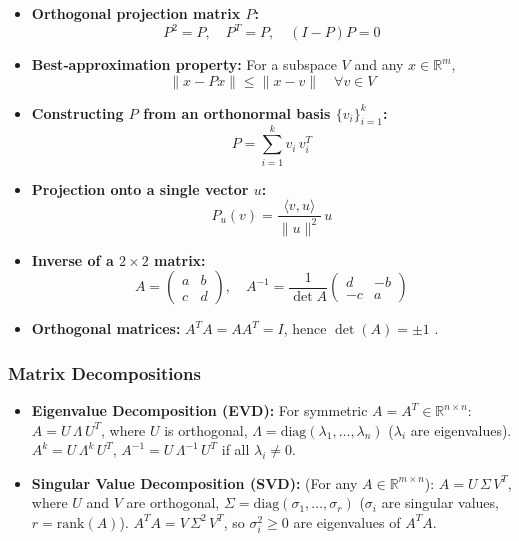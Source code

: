 \begin{itemize}
            \begin{graytext}(3)\end{graytext} $\ker(A)=\{0\}$,\hspace{1.5em} \begin{graytext}(4)\end{graytext} $\mathrm{im}(A)=\mathbb R^n$
      \item \textbf{Orthogonal projection matrix \(P\):}
            \[
                  P^2=P,\quad P^T=P,\quad (I-P)P=0
            \]
      \item \textbf{Best‐approximation property:}
            For a subspace \(V\) and any \(x\in\mathbb R^m\),
            \[
                  \|x-Px\|\le\|x-v\|\quad\forall v\in V
            \]
      \item \textbf{Constructing \(P\) from an orthonormal basis \(\{v_i\}_{i=1}^k\):}
            \vspace{-0.7em}
            \[
                  P=\sum_{i=1}^k v_i\,v_i^T
            \]
            \vspace{-0.5em}
      \item \textbf{Projection onto a single vector \(u\):}
            \[
                  P_u(v)
                  =\frac{\langle v,u\rangle}{\|u\|^2}\,u
            \]
      \item \textbf{Inverse of a \(2\times2\) matrix:}
            \[
                  A=\begin{pmatrix}a&b\\c&d\end{pmatrix},\quad
                  A^{-1}=\frac1{\det A}\begin{pmatrix}d&-b\\-c&a\end{pmatrix}
            \]
      \item \textbf{Orthogonal matrices:}
            \(A^TA=AA^T=I\), hence \(\det(A)=\pm1\) .
\end{itemize}

\subsubsection{Matrix Decompositions}
\begin{itemize}
      \item \textbf{Eigenvalue Decomposition (EVD):}
            For symmetric $A = A^T \in \mathbb{R}^{n \times n}$:
            $A = U\,\Lambda\,U^T$, where $U$ is orthogonal, $\Lambda = \mathrm{diag}(\lambda_1, \dots, \lambda_n)$ ($\lambda_i$ are eigenvalues). $A^k = U\,\Lambda^k\,U^T$, $A^{-1} = U\,\Lambda^{-1}\,U^T$ if all $\lambda_i \neq 0$.
      \item \textbf{Singular Value Decomposition (SVD):}
            (For any $A \in \mathbb{R}^{m \times n}$): $A = U\,\Sigma\,V^T$, where $U$ and $V$ are orthogonal, $\Sigma = \mathrm{diag}(\sigma_1, \dots, \sigma_r)$ ($\sigma_i$ are singular values, $r = \mathrm{rank}(A)$). $A^T A = V\,\Sigma^2\,V^T$, so \(\sigma_i^2\ge0\) are eigenvalues of $A^T A$.
\end{itemize}

